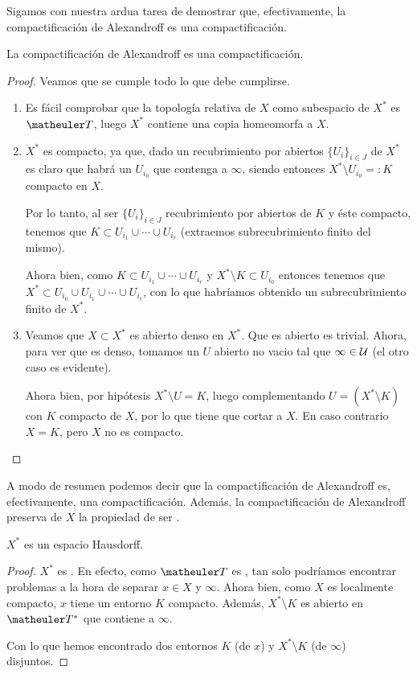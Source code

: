 Sigamos con nuestra ardua tarea de demostrar que, efectivamente, la compactificación de Alexandroff es una compactificación.

\begin{prop}[Consistencia]
	La compactificación de Alexandroff es una compactificación.
\end{prop}
\begin{proof}
	Veamos que se cumple todo lo que debe cumplirse.
	\begin{enumerate}
		\item Es fácil comprobar que la topología relativa de $X$ como subespacio de $X^*$ es $\T$, luego $X^*$ contiene una copia homeomorfa a $X$.
		\item $X^*$ es compacto, ya que, dado un recubrimiento por abiertos $\{U_i\}_{i\in J}$ de $X^*$ es claro que habrá un $U_{i_0}$ que contenga a $\infty$, siendo entonces $X^*\setminus U_{i_0}=:K$ compacto en $X$.
		
		Por lo tanto, al ser $\{U_i\}_{i\in J}$ recubrimiento por abiertos de $K$ y éste compacto, tenemos que $K\subset U_{i_1}\cup\cdots\cup U_{i_r}$ (extraemos subrecubrimiento finito del mismo).
		
		Ahora bien, como $K\subset U_{i_1}\cup\cdots\cup U_{i_r}$ y $X^*\setminus K\subset U_{i_0}$ entonces tenemos que $X^*\subset U_{i_0}\cup  U_{i_1}\cup\cdots\cup U_{i_r}$, con lo que habríamos obtenido un subrecubrimiento finito de $X^*$.
		\item Veamos que $X\subset X^*$ es abierto denso en $X^*$. Que es abierto es trivial. Ahora, para ver que es denso, tomamos un $U$ abierto no vacio tal que $\infty\in\mathcal{U}$ (el otro caso es evidente).
		
		Ahora bien, por hipótesis $X^*\setminus U = K$, luego complementando $U=(X^*\setminus K)$ con $K$ compacto de $X$, por lo que tiene que cortar a $X$. En caso contrario $X=K$, pero $X$ no es compacto.\qedhere
	\end{enumerate}
\end{proof}
A modo de resumen podemos decir que la compactificación de Alexandroff es, efectivamente, una compactificación. Además, la compactificación de Alexandroff preserva de $X$ la propiedad de ser \hausdorff.
\begin{lem}
	$X^*$ es un espacio Hausdorff.
\end{lem}
\begin{proof}
	 $X^*$ es \hausdorff. En efecto, como $\T$ es \hausdorff, tan solo podríamos encontrar problemas a la hora de separar $x\in X$ y $\infty$. Ahora bien, como $X$ es localmente compacto, $x$ tiene un entorno $K$ compacto. Además, $X^*\setminus K$ es abierto en $\T^*$ que contiene a $\infty$.
	 
	 Con lo que hemos encontrado dos entornos $K$ (de $x$) y $X^*\setminus K$ (de $\infty$) disjuntos.
\end{proof}
